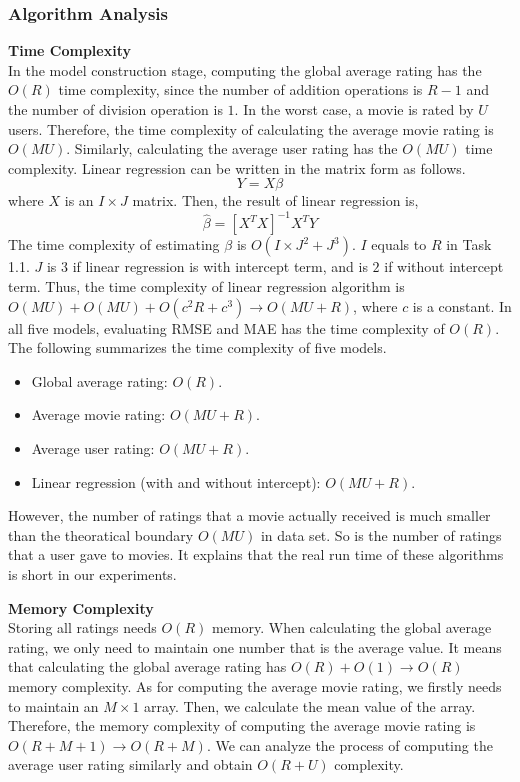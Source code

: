 \documentclass[12pt]{article}
\begin{document}
\subsubsection{Algorithm Analysis}
\noindent\textbf{Time Complexity}\\
In the model construction stage, computing the global average rating has the $O(R)$ time complexity, since the number of addition operations is $R - 1$ and the number of division operation is $1$. In the worst case, a movie is rated by $U$ users. Therefore, the time complexity of calculating the average movie rating is $O(MU)$. Similarly, calculating the average user rating has the $O(MU)$ time complexity. Linear regression can be written in the matrix form as follows.
$$
Y = X\beta
$$
where $X$ is an $I\times J$ matrix. Then, the result of linear regression is,
$$
\hat{\beta} = \left[ X^TX \right]^{-1} X^TY
$$
The time complexity of estimating $\beta$ is $O(I\times J^2 + J^3)$. $I$ equals to $R$ in Task 1.1. $J$ is $3$ if linear regression is with intercept term, and is $2$ if without intercept term. Thus, the time complexity of linear regression algorithm is $O(MU) + O(MU) + O(c^2R + c^3)\rightarrow O(MU + R)$, where $c$ is a constant. In all five models, evaluating RMSE and MAE has the time complexity of $O(R)$. The following summarizes the time complexity of five models.
\begin{itemize}
    \item Global average rating: $O(R)$.
    \item Average movie rating: $O(MU + R)$.
    \item Average user rating: $O(MU + R)$.
    \item Linear regression (with and without intercept): $O(MU + R)$.
\end{itemize}
\par
However, the number of ratings that a movie actually received is much smaller than the theoratical boundary $O(MU)$ in data set. So is the number of ratings that a user gave to movies. It explains that the real run time of these algorithms is short in our experiments. \par
\vspace{0.3cm}
\noindent\textbf{Memory Complexity}\\
Storing all ratings needs $O(R)$ memory. When calculating the global average rating, we only need to maintain one number that is the average value. It means that calculating the global average rating has $O(R) + O(1)\rightarrow O(R)$ memory complexity. As for computing the average movie rating, we firstly needs to maintain an $M\times 1$ array. Then, we calculate the mean value of the array. Therefore, the memory complexity of computing the average movie rating is $O(R + M + 1) \rightarrow O(R + M)$. We can analyze the process of computing the average user rating similarly and obtain $O(R + U)$ complexity.
\end{document}

